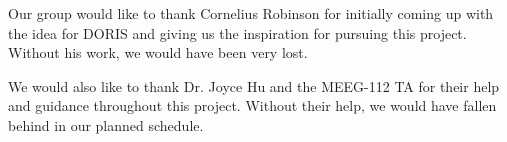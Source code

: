 
Our group would like to thank Cornelius Robinson for initially coming up with the idea for DORIS and giving us the inspiration for pursuing this project. Without his work, we would have been very lost.

We would also like to thank Dr. Joyce Hu and the MEEG-112 TA for their help and guidance throughout this project. Without their help, we would have fallen behind in our planned schedule.